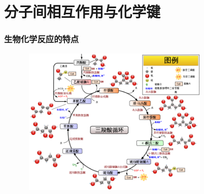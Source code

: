 \small
\section{分子间相互作用与化学键}
%
\frame
{
	\frametitle{生物化学反应的特点}
\begin{figure}[h!]
\centering
\vspace{-10.5pt}
\includegraphics[height=2.80in,width=3.70in,viewport=0 0 750 600,clip]{Figures/Citric_acid_cycle_with_aconitate_Chinese.png}
\label{Bio-Chem}
\end{figure}
}

